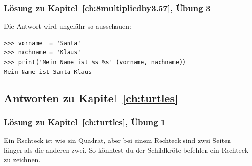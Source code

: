 \noindent
\subsubsection{Lösung zu Kapitel~\ref{ch:8multipliedby3.57}, Übung 3}
Die Antwort wird ungefähr so ausschauen:

\begin{Verbatim}[frame=single]
>>> vorname  = 'Santa'
>>> nachname = 'Klaus'
>>> print('Mein Name ist %s %s' (vorname, nachname))
Mein Name ist Santa Klaus
\end{Verbatim}

\subsection*{Antworten zu Kapitel~\ref{ch:turtles}}

\noindent
\subsubsection{Lösung zu Kapitel~\ref{ch:turtles}, Übung 1}
Ein Rechteck ist wie ein Quadrat, aber bei einem Rechteck sind zwei Seiten länger als die anderen zwei. So könntest du der Schildkröte befehlen ein Rechteck zu zeichnen.

